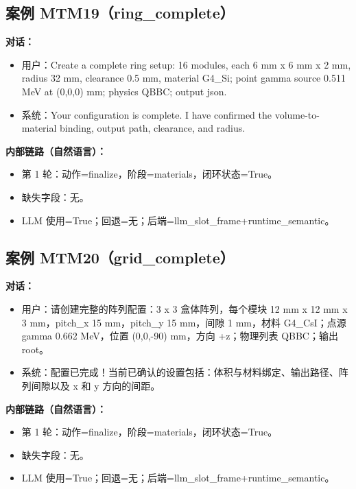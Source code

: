 \documentclass[11pt]{ctexart}
\begin{document}
\subsection{案例 MTM19（ring\_complete）}
\textbf{对话：}
\begin{itemize}
\item 用户：Create a complete ring setup: 16 modules, each 6 mm x 6 mm x 2 mm, radius 32 mm, clearance 0.5 mm, material G4\_Si; point gamma source 0.511 MeV at (0,0,0) mm; physics QBBC; output json.
\item 系统：Your configuration is complete. I have confirmed the volume-to-material binding, output path, clearance, and radius.
\end{itemize}
\textbf{内部链路（自然语言）：}
\begin{itemize}
\item 第 1 轮：动作=finalize，阶段=materials，闭环状态=True。
\item 缺失字段：无。
\item LLM 使用=True；回退=无；后端=llm\_slot\_frame+runtime\_semantic。
\end{itemize}
\subsection{案例 MTM20（grid\_complete）}
\textbf{对话：}
\begin{itemize}
\item 用户：请创建完整的阵列配置：3 x 3 盒体阵列，每个模块 12 mm x 12 mm x 3 mm，pitch\_x 15 mm，pitch\_y 15 mm，间隙 1 mm，材料 G4\_CsI；点源 gamma 0.662 MeV，位置 (0,0,-90) mm，方向 +z；物理列表 QBBC；输出 root。
\item 系统：配置已完成！当前已确认的设置包括：体积与材料绑定、输出路径、阵列间隙以及 x 和 y 方向的间距。
\end{itemize}
\textbf{内部链路（自然语言）：}
\begin{itemize}
\item 第 1 轮：动作=finalize，阶段=materials，闭环状态=True。
\item 缺失字段：无。
\item LLM 使用=True；回退=无；后端=llm\_slot\_frame+runtime\_semantic。
\end{itemize}
\end{document}
